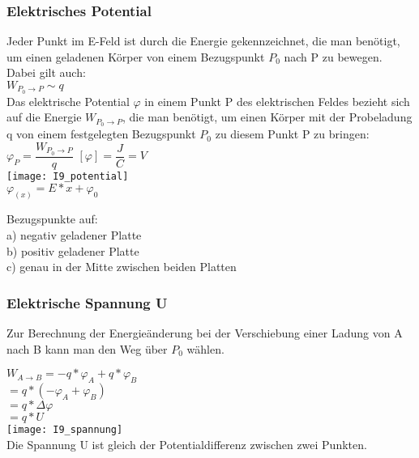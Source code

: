 \subsubsection{Elektrisches Potential}
Jeder Punkt im E-Feld ist durch die Energie gekennzeichnet, die man benötigt, um einen geladenen Körper von einem Bezugspunkt $P_{0}$ nach P zu bewegen. Dabei gilt auch:
\vspace{2mm} \\
$ W_{P_{0} \rightarrow P} \sim q $
\vspace{2mm} \\
Das elektrische Potential $\varphi$ in einem Punkt P des elektrischen Feldes bezieht sich auf die Energie $W_{P_{0} \rightarrow P}$, die man benötigt, um einen Körper mit der Probeladung q von einem festgelegten Bezugspunkt $P_{0}$ zu diesem Punkt P zu bringen:
\vspace{2mm} \\
$ \varphi_{P} = \dfrac{W_{P_{0} \rightarrow P}}{q} $ \hspace{5mm} $ [\varphi] = \dfrac{J}{C} = V $
\vspace{2mm} \\
\texttt{[image: I9\_potential]}
\vspace{2mm} \\
$\varphi_{(x)} = E \ast x + \varphi_{0}$ 

\vspace{2mm}
Bezugspunkte auf: \\
a) negativ geladener Platte \\
b) positiv geladener Platte \\
c) genau in der Mitte zwischen beiden Platten \\

\newpage

\subsubsection{Elektrische Spannung U}
Zur Berechnung der Energieänderung bei der Verschiebung einer Ladung von A nach B kann man den Weg über $P_{0}$ wählen. 

\vspace{2mm}
$ W_{A \rightarrow B} = -q \ast \varphi_{A} + q \ast \varphi_{B} $ \\
\hspace{11.5mm} $ = q \ast (- \varphi_{A} + \varphi_{B}) $ \\
\hspace{11.5mm} $ = q \ast \Delta \varphi $ \\
\hspace{11.5mm} $ = q \ast U  $ 
\vspace{2mm} \\
\texttt{[image: I9\_spannung]}
\vspace{2mm} \\
Die Spannung U ist gleich der Potentialdifferenz zwischen zwei Punkten.

